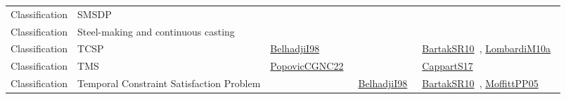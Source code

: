{\begin{longtable}{lp{3cm}>{\raggedright\arraybackslash}p{6cm}>{\raggedright\arraybackslash}p{6cm}>{\raggedright\arraybackslash}p{8cm}}
Classification & SMSDP &  &  & \\
Classification & Steel-making and continuous casting &  &  & \\
Classification & TCSP & \href{articles/BelhadjiI98.pdf}{BelhadjiI98}~\cite{BelhadjiI98} &  & \href{articles/BartakSR10.pdf}{BartakSR10}~\cite{BartakSR10}, \href{articles/LombardiM10a.pdf}{LombardiM10a}~\cite{LombardiM10a}\\
Classification & TMS & \href{papers/PopovicCGNC22.pdf}{PopovicCGNC22}~\cite{PopovicCGNC22} &  & \href{papers/CappartS17.pdf}{CappartS17}~\cite{CappartS17}\\
Classification & Temporal Constraint Satisfaction Problem &  & \href{articles/BelhadjiI98.pdf}{BelhadjiI98}~\cite{BelhadjiI98} & \href{articles/BartakSR10.pdf}{BartakSR10}~\cite{BartakSR10}, \href{papers/MoffittPP05.pdf}{MoffittPP05}~\cite{MoffittPP05}\\

\end{longtable}}
